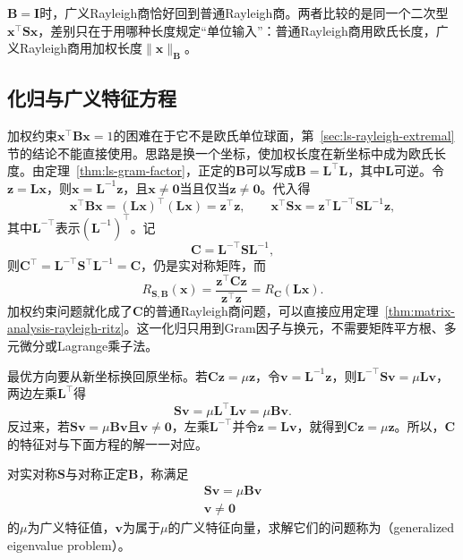 $\bm B=\bm I$时，广义Rayleigh商恰好回到普通Rayleigh商。两者比较的是同一个二次型$\bm x^\top\bm S\bm x$，差别只在于用哪种长度规定“单位输入”：普通Rayleigh商用欧氏长度，广义Rayleigh商用加权长度$\lVert\bm x\rVert_{\bm B}$。

\subsection{化归与广义特征方程}
\label{sec:ls-generalized-eigen-reduction}

加权约束$\bm x^\top\bm B\bm x=1$的困难在于它不是欧氏单位球面，第~\ref{sec:ls-rayleigh-extremal}节的结论不能直接使用。思路是换一个坐标，使加权长度在新坐标中成为欧氏长度。由定理~\ref{thm:ls-gram-factor}，正定的$\bm B$可以写成$\bm B=\bm L^\top\bm L$，其中$\bm L$可逆。令$\bm z=\bm L\bm x$，则$\bm x=\bm L^{-1}\bm z$，且$\bm x\neq\bm0$当且仅当$\bm z\neq\bm0$。代入得
\[
 \bm x^\top\bm B\bm x=(\bm L\bm x)^\top(\bm L\bm x)=\bm z^\top\bm z,\qquad
 \bm x^\top\bm S\bm x=\bm z^\top\bm L^{-\top}\bm S\bm L^{-1}\bm z ,
\]
其中$\bm L^{-\top}$表示$(\bm L^{-1})^\top$。记
\[
 \bm C=\bm L^{-\top}\bm S\bm L^{-1},
\]
则$\bm C^\top=\bm L^{-\top}\bm S^\top\bm L^{-1}=\bm C$，仍是实对称矩阵，而
\[
 R_{\bm S,\bm B}(\bm x)=\frac{\bm z^\top\bm C\bm z}{\bm z^\top\bm z}=R_{\bm C}(\bm L\bm x).
\]
加权约束问题就化成了$\bm C$的普通Rayleigh商问题，可以直接应用定理~\ref{thm:matrix-analysis-rayleigh-ritz}。这一化归只用到Gram因子与换元，不需要矩阵平方根、多元微分或Lagrange乘子法。

最优方向要从新坐标换回原坐标。若$\bm C\bm z=\mu\bm z$，令$\bm v=\bm L^{-1}\bm z$，则$\bm L^{-\top}\bm S\bm v=\mu\bm L\bm v$，两边左乘$\bm L^\top$得
\[
 \bm S\bm v=\mu\bm L^\top\bm L\bm v=\mu\bm B\bm v .
\]
反过来，若$\bm S\bm v=\mu\bm B\bm v$且$\bm v\neq\bm0$，左乘$\bm L^{-\top}$并令$\bm z=\bm L\bm v$，就得到$\bm C\bm z=\mu\bm z$。所以，$\bm C$的特征对与下面方程的解一一对应。

\begin{definition}[广义特征值]
\label{def:matrix-analysis-generalized-eigenvalue}
对实对称$\bm S$与对称正定$\bm B$，称满足
\begin{equation}
\begin{gathered}
\bm S\bm v=\mu\bm B\bm v\\
\bm v\neq\bm0
\end{gathered}
\label{eq:matrix-analysis-generalized-eigenproblem}
\end{equation}
的$\mu$为广义特征值，$\bm v$为属于$\mu$的广义特征向量，求解它们的问题称为（generalized eigenvalue problem）。
\end{definition}

